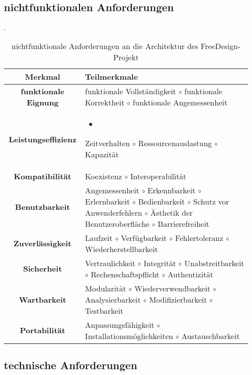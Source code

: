 \subsection{nichtfunktionalen Anforderungen}
\begin{table}[H]
    \centering
    \caption{nichtfunktionale Anforderungen an die Architektur des FreeDesign-Projekt}. 
    \label{table:nfqa}
    \begin{tabularx}{\columnwidth}{c|X}
    \textbf{Merkmal} & \textbf{Teilmerkmale} \\
    \hline
    \hline
    \textbf{funktionale Eignung} & 
        funktionale Vollständigkeit {$\circ$} funktionale Korrektheit {$\circ$} funktionale Angemessenheit 
    \\
    \hline
    \textbf{Leistungseffizienz}  & 
        \begin{itemize}
            \item 
        \end{itemize}
        Zeitverhalten {$\circ$} Ressourcenauslastung {$\circ$} Kapazität
    \\
    \hline
    \textbf{Kompatibilität}  & 
        Koexistenz {$\circ$} Interoperabilität
    \\
    \hline
    \textbf{Benutzbarkeit}  & 
        Angemessenheit {$\circ$} Erkennbarkeit {$\circ$} Erlernbarkeit {$\circ$} Bedienbarkeit {$\circ$} Schutz vor Anwenderfehlern {$\circ$} Ästhetik der Benutzeroberfläche {$\circ$} Barrierefreiheit
    \\
    \hline
    \textbf{Zuverlässigkeit}  & 
        Laufzeit {$\circ$} Verfügbarkeit {$\circ$} Fehlertoleranz {$\circ$} Wiederherstellbarkeit
    \\
    \hline
    \textbf{Sicherheit}  & 
        Vertraulichkeit {$\circ$} Integrität {$\circ$} Unabstreitbarkeit {$\circ$} Rechenschaftspflicht {$\circ$} Authentizität 
    \\
    \hline
    \textbf{Wartbarkeit}  & 
        Modularität {$\circ$} Wiederverwendbarkeit {$\circ$} Analysierbarkeit {$\circ$} Modifizierbarkeit {$\circ$} Testbarkeit
    \\
    \hline
    \textbf{Portabilität} & 
        Anpassungsfähigkeit {$\circ$} Installationsmöglichkeiten {$\circ$} \newline Austauschbarkeit
\end{tabularx}
\end{table}

\subsection{technische Anforderungen}

